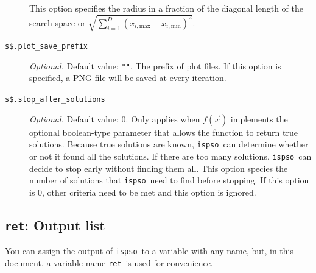 \documentclass{article}
\def\ispso{\texttt{ispso}}
\def\ret{\texttt{ret}}
\begin{document}
\begin{description}
    This option specifies the radius in a fraction of the diagonal length of the search space or $\sqrt{\sum_{i=1}^D\left(x_{i,\text{max}}-x_{i,\text{min}}\right)^2}$.
  \item[\texttt{s\$.plot\_save\_prefix}]
    \textit{Optional.}
    Default value: \texttt{""}.
    The prefix of plot files.
    If this option is specified, a PNG file will be saved at every iteration.
  \item[\texttt{s\$.stop\_after\_solutions}]
    \textit{Optional.}
    Default value: 0.
    Only applies when $f(\vec{x})$ implements the optional boolean-type parameter that allows the function to return true solutions.
    Because true solutions are known, \ispso\ can determine whether or not it found all the solutions.
    If there are too many solutions, \ispso\ can decide to stop early without finding them all.
    This option species the number of solutions that \ispso\ need to find before stopping.
    If this option is 0, other criteria need to be met and this option is ignored.
\end{description}

\subsection{\ret: Output list}

You can assign the output of \ispso\ to a variable with any name, but, in this document, a variable name \ret\ is used for convenience.
\end{document}
